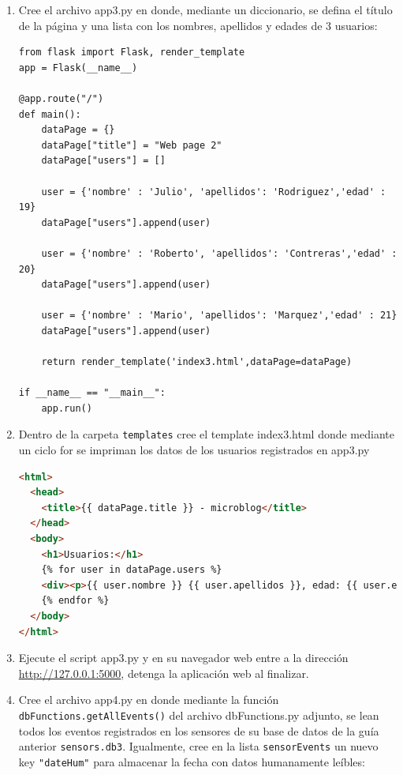 \documentclass[10pt,letterpaper]{article}
\begin{document}
\begin{enumerate}
\newpage
\item Cree el archivo app3.py en donde, mediante un diccionario, se defina el título de la página y una lista con los nombres, apellidos y edades de 3 usuarios: 
\begin{lstlisting}[style=myCustomPythonStyle]
from flask import Flask, render_template
app = Flask(__name__)

@app.route("/")
def main():
    dataPage = {}
    dataPage["title"] = "Web page 2"
    dataPage["users"] = []

    user = {'nombre' : 'Julio', 'apellidos': 'Rodriguez','edad' : 19}
    dataPage["users"].append(user)

    user = {'nombre' : 'Roberto', 'apellidos': 'Contreras','edad' : 20}
    dataPage["users"].append(user)

    user = {'nombre' : 'Mario', 'apellidos': 'Marquez','edad' : 21}
    dataPage["users"].append(user)

    return render_template('index3.html',dataPage=dataPage)

if __name__ == "__main__":
    app.run()
\end{lstlisting}

\item Dentro de la carpeta \verb|templates| cree el template index3.html donde mediante un ciclo for se impriman los datos de los usuarios registrados en app3.py

\begin{lstlisting}[language=html,basicstyle=\footnotesize,frame=tb,columns=fullflexible]
<html>
  <head>
    <title>{{ dataPage.title }} - microblog</title>
  </head>
  <body>
    <h1>Usuarios:</h1>
    {% for user in dataPage.users %}
    <div><p>{{ user.nombre }} {{ user.apellidos }}, edad: {{ user.edad }} </p></div>
    {% endfor %}
  </body>
</html>
\end{lstlisting}

\item Ejecute el script app3.py y en su navegador web entre a la dirección \url{http://127.0.0.1:5000}, detenga la aplicación web al finalizar. 



\newpage
\item Cree el archivo app4.py en donde mediante la función \verb|dbFunctions.getAllEvents()| del archivo dbFunctions.py adjunto, se lean todos los eventos registrados en los sensores de su base de datos de la guía anterior \verb|sensors.db3|. Igualmente, cree en la lista \verb|sensorEvents| un nuevo key \verb|"dateHum"| para almacenar la fecha con datos humanamente leíbles:


\end{enumerate}
\end{document}
